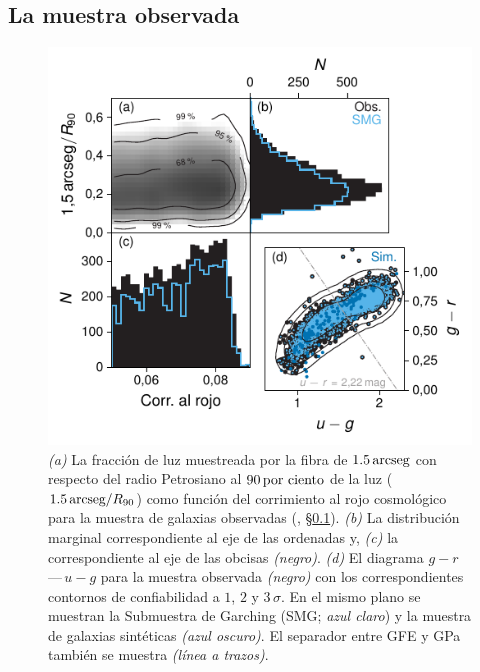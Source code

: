 \subsection{La muestra observada}\label{sc:obs-sample}
\begin{figure}
\centering
\includegraphics[scale=1]{figures/sample_chars}
%
\caption{\emph{(a)} La fracción de luz muestreada por la fibra de $\unit[1.5]{arcseg}$ con respecto
del radio Petrosiano al $\unit[90]{por ciento}$ de la luz ($\unit[1.5]{arcseg}/R_{90}$) como función
del corrimiento al rojo cosmológico para la muestra de galaxias observadas (\cf,
\S\ref{sc:obs-sample}). \emph{(b)} La distribución marginal correspondiente al eje de las ordenadas
y, \emph{(c)} la correspondiente al eje de las obcisas \emph{(negro)}. \emph{(d)} El diagrama
$g-r\,$---$\,u-g$ para la muestra observada \emph{(negro)} con los correspondientes contornos de
confiabilidad a $1$, $2$ y $3\,\sigma$. En el mismo plano se muestran la Submuestra de Garching
(SMG; \emph{azul claro}) y la muestra de galaxias sintéticas \emph{(azul oscuro)}. El separador
entre GFE y GPa también se muestra \emph{(línea a trazos)}.}
%
\label{fig:samples}
\end{figure}


